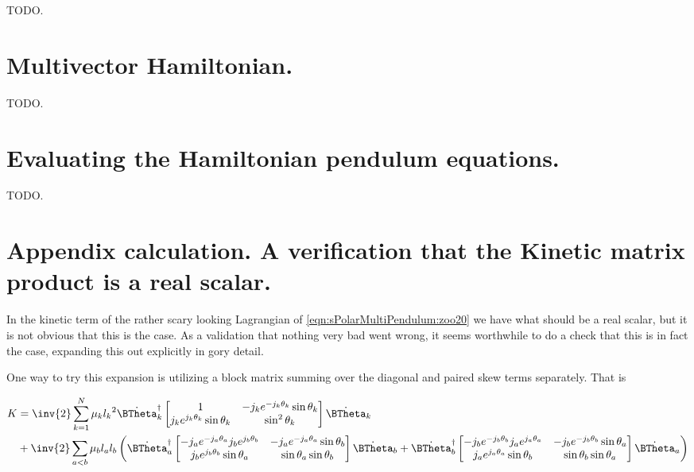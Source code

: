 TODO.

\section{Multivector Hamiltonian.}

TODO.

\section{Evaluating the Hamiltonian pendulum equations.}

TODO.

\section{Appendix calculation.  A verification that the Kinetic matrix product is a real scalar.}

In the kinetic term of the rather scary looking Lagrangian of \ref{eqn:sPolarMultiPendulum:zoo20} we have what should be a real scalar, but it is not obvious that this is the case.  As a validation that nothing very bad went wrong, it seems worthwhile to do a check that this is in fact the case, expanding this out explicitly in gory detail.

One way to try this expansion is utilizing a block matrix summing over the diagonal and paired skew terms separately.  That is

\begin{align*}
K &=
\inv{2}
\sum_{k=1}^N
\mu_k
{l_k}^2
{\dot{\BTheta}_k}^\dagger
\begin{bmatrix}
1 & - j_k e^{-j_k \theta_k} \sin\theta_k \\
j_k e^{j_k \theta_k} \sin\theta_k & \sin^2\theta_k 
\end{bmatrix}
\dot{\BTheta}_k \\
&+
\inv{2}
\sum_{a<b}
\mu_b
l_a l_b
\left(
{\dot{\BTheta}_a}^\dagger
\begin{bmatrix}
- j_a e^{-j_a \theta_a} j_b e^{j_b\theta_b} & - j_a e^{-j_a \theta_a} \sin\theta_b \\
j_b e^{j_b \theta_b} \sin\theta_a & \sin\theta_a \sin\theta_b
\end{bmatrix}
\dot{\BTheta}_b 
+
{\dot{\BTheta}_b}^\dagger
\begin{bmatrix}
- j_b e^{-j_b \theta_b} j_a e^{j_a\theta_a} & - j_b e^{-j_b \theta_b} \sin\theta_a \\
j_a e^{j_a \theta_a} \sin\theta_b & \sin\theta_b \sin\theta_a
\end{bmatrix}
\dot{\BTheta}_a
\right)
\end{align*}

